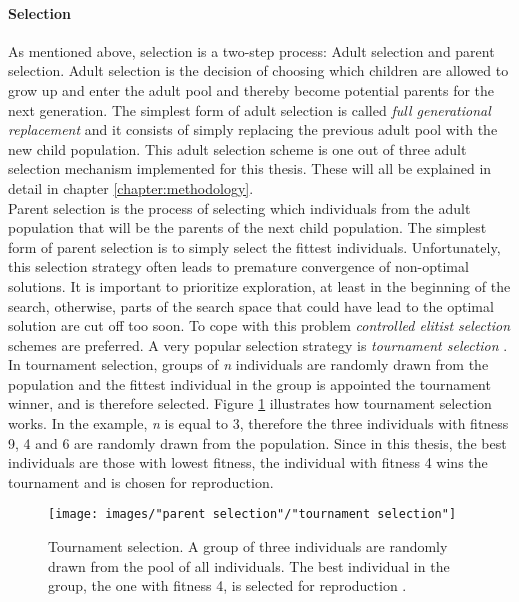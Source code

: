 \paragraph*{Selection}
As mentioned above, selection is a two-step process: Adult selection and parent selection. Adult selection is the decision of choosing which children are allowed to grow up and enter the adult pool and thereby become potential parents for the next generation. The simplest form of adult selection is called \textit{full generational replacement} and it consists of simply replacing the previous adult pool with the new child population. This adult selection scheme is one out of three adult selection mechanism implemented for this thesis. These will all be explained in detail in chapter \ref{chapter:methodology}.\\

\noindent Parent selection is the process of selecting which individuals from the adult population that will be the parents of the next child population. The simplest form of parent selection is to simply select the fittest individuals. Unfortunately, this selection strategy often leads to premature convergence of non-optimal solutions. It is important to prioritize exploration, at least in the beginning of the search, otherwise, parts of the search space that could have lead to the optimal solution are cut off too soon. To cope with this problem \textit{controlled elitist selection} schemes are preferred. A very popular selection strategy is \textit{tournament selection} \citep{Razali}. In tournament selection, groups of \textit{n} individuals are randomly drawn from the population and the fittest individual in the group is appointed the tournament winner, and is therefore selected. Figure \ref{Tournament selection} illustrates how tournament selection works. In the example, \textit{n} is equal to 3, therefore the three individuals with fitness 9, 4 and 6 are randomly drawn from the population. Since in this thesis, the best individuals are those with lowest fitness, the individual with fitness 4 wins the tournament and is chosen for reproduction.\\


\begin{figure}[h!]
\begin{center}
\texttt{[image: images/"parent selection"/"tournament selection"]}
\caption{Tournament selection. A group of three individuals are randomly drawn from the pool of all individuals. The best individual  in the group, the one with fitness 4, is selected for reproduction \citep{Razali}.}
\label{Tournament selection}
\end{center}
\end{figure}


